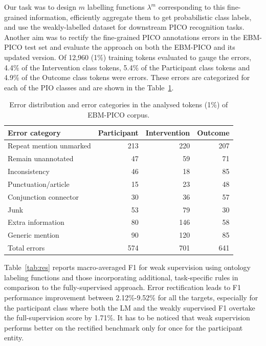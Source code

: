 \documentclass[10.7pt,]{article}
\begin{document}
%
%
%
Our task was to design $m$ labelling functions $\lambda^{m}$ corresponding to this fine-grained information, efficiently aggregate them to get probabilistic class labels, and use the weakly-labelled dataset for downstream PICO recognition tasks.
Another aim was to rectify the fine-grained PICO annotations errors in the EBM-PICO test set and evaluate the approach on both the EBM-PICO and its updated version.
%
Of 12,960 (1\%) training tokens evaluated to gauge the errors, 4.4\% of the Intervention class tokens, 5.4\% of the Participant class tokens and 4.9\% of the Outcome class tokens were errors.
These errors are categorized for each of the PIO classes and are shown in the Table~\ref{tab:errordist}.
%

\begin{table}[!ht]
    \centering
    \begin{tabular}{|l|r|r|r|}
    \hline
        Error category & Participant & Intervention & Outcome \\ \hline
        Repeat mention unmarked & 213 & 220 & 207 \\ 
        Remain unannotated & 47 & 59 & 71 \\ 
        Inconsistency & 46 & 18 & 85 \\ 
        Punctuation/article & 15 & 23 & 48 \\ 
        Conjunction connector & 30 & 36 & 57 \\ 
        Junk & 53 & 79 & 30 \\ 
        Extra information & 80 & 146 & 58 \\ 
        Generic mention & 90 & 120 & 85 \\ \hline
        Total errors & 574 & 701 & 641 \\ \hline
    \end{tabular}
    \caption{\label{tab:errordist} Error distribution and error categories in the analysed tokens (1\%) of EBM-PICO corpus.}
\end{table}
%
%
%
Table~\ref{tab:res} reports macro-averaged F1 for weak supervision using ontology labeling functions and those incorporating additional, task-specific rules in comparison to the fully-supervised approach.
Error rectification leads to F1 performance improvement between 2.12\%-9.52\% for all the targets, especially for the participant class where both the LM and the weakly supervised F1 overtake the full-supervision score by 1.71\%. 
It has to be noticed that weak supervision performs better on the rectified benchmark only for once for the participant entity.
\end{document}
